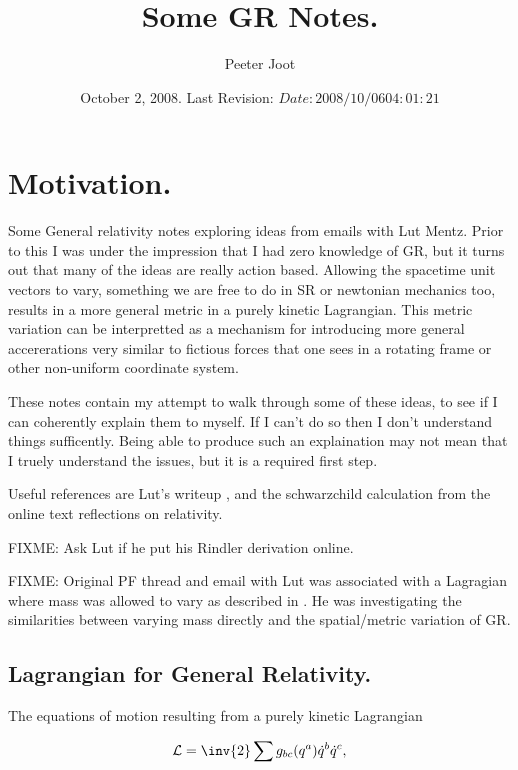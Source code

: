 \documentclass{article}      %
\title{ Some GR Notes. } %
\author{Peeter Joot}         %
\date{ October 2, 2008.  Last Revision: $Date: 2008/10/06 04:01:21 $ } %
\newcommand{\LL}[0]{\mathcal{L}}
\newcommand{\qdot}[0]{\dot{q}}
\begin{document}

\maketitle{}

\tableofcontents

\section{ Motivation. }

Some General relativity notes exploring ideas from emails with Lut Mentz.
Prior to this I was under the impression that I had zero knowledge of GR,
but it turns out that many of the ideas are really action based. 
Allowing the spacetime unit vectors to vary, something we are free to
do in SR or newtonian mechanics too, results in a more 
general metric in a purely kinetic Lagrangian.  This metric variation
can be interpretted as a mechanism for introducing more general
accererations very similar to fictious forces that one sees in a
rotating frame or other non-uniform coordinate system.

These notes contain my attempt to walk through some of these ideas, to see
if I can coherently explain them to myself.  If I can't do so then I don't
understand things sufficently.  Being able to produce such an explaination
may not mean that I truely understand the issues, but it is a required
first step.

Useful references are Lut's writeup \cite{lutSchwarzChildRadial}, 
and the schwarzchild calculation \cite{mathpagesSchwarzChildRadial}
from the online text reflections on relativity.

FIXME: Ask Lut if he put his Rindler derivation online.

FIXME: Original PF thread and email with Lut was associated with 
a Lagragian where mass was allowed to vary as described in \cite{PJMassVary}.  He was
investigating the similarities between varying mass directly and the spatial/metric
variation of GR.

\subsection{ Lagrangian for General Relativity. }

The equations of motion resulting from a purely kinetic Lagrangian

\begin{equation}\label{eqn:keLagrangian}
\LL = \inv{2} \sum  g_{b c}(q^a) \qdot^b \qdot^c,
\end{equation}
\end{document}
